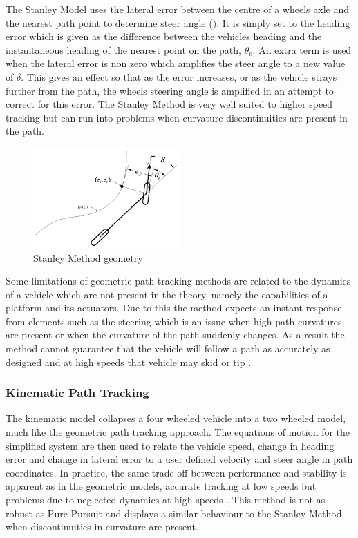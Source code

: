 \documentclass[main.tex]{subfiles}
\begin{document}
The Stanley Model uses the lateral error between the centre of a wheels axle and the nearest path point  to determine steer angle (). It is simply set to the heading error which is given as the difference between the vehicles heading and the instantaneous heading of the nearest point on the path, $\theta_e$. An extra term is used when the lateral error is non zero which amplifies the steer angle to a new value of $\delta$.  This gives an effect so that as the error increases, or as the vehicle strays further from the path, the wheels steering angle is amplified in an attempt to correct for this error. The Stanley Method is very well suited to higher speed tracking but can run into problems when curvature discontinuities are present in the path.
\begin{figure}[ht]
\includegraphics[width=0.5\textwidth]{3-LiteratureReview/stanleyMethod.png}
\centering
\caption[Stanley Method geometry]{Stanley Method geometry \parencite{snider2009}} 
\end{figure}

Some limitations of geometric path tracking methods are related to the dynamics of a vehicle which are not present in the theory, namely the capabilities of a platform and its actuators. Due to this the method expects an instant response from elements such as the steering which is an issue when high path curvatures are present or when the curvature of the path suddenly changes. As a result the method cannot guarantee that the vehicle will follow a path as accurately as designed and at high speeds that vehicle may skid or tip \parencite{coulter1992}.

\subsubsection{Kinematic Path Tracking}
The kinematic model collapses a four wheeled vehicle into a two wheeled model, much like the geometric path tracking approach. The equations of motion for the simplified system are then used to relate the vehicle speed, change in heading error and change in lateral error to a user defined velocity and steer angle in path coordinates. In practice, the same trade off between performance and stability is apparent as in the geometric models, accurate tracking at low speeds but problems due to neglected dynamics at high speeds \parencite{snider2009}. This method is not as robust as Pure Pursuit and displays a similar behaviour to the Stanley Method when discontinuities in curvature are present.
\end{document}
